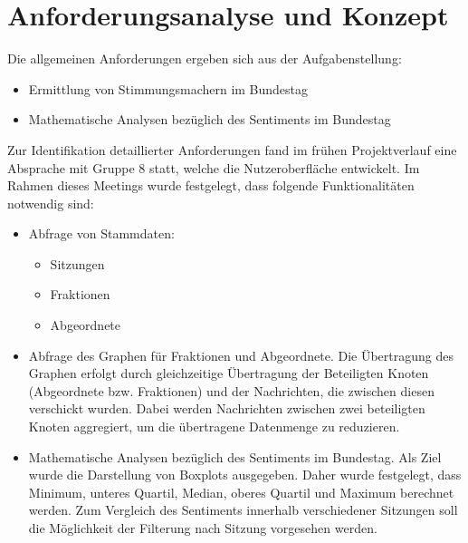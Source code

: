 \section{Anforderungsanalyse und Konzept}\label{sec:07_03_anforderungen_konzept}

Die allgemeinen Anforderungen ergeben sich aus der Aufgabenstellung:
\begin{itemize}
	\item Ermittlung von Stimmungsmachern im Bundestag
	\item Mathematische Analysen bezüglich des Sentiments im Bundestag
\end{itemize}

Zur Identifikation detaillierter Anforderungen fand im frühen Projektverlauf eine Absprache mit Gruppe 8 statt, welche die Nutzeroberfläche entwickelt.
Im Rahmen dieses Meetings wurde festgelegt, dass folgende Funktionalitäten notwendig sind:
\begin{itemize}
	\item Abfrage von Stammdaten:
	\begin{itemize}
		\item Sitzungen
		\item Fraktionen
		\item Abgeordnete
	\end{itemize}
	\item Abfrage des Graphen für Fraktionen und Abgeordnete. Die Übertragung des Graphen erfolgt durch gleichzeitige Übertragung der Beteiligten Knoten (Abgeordnete bzw. Fraktionen) und der Nachrichten, die zwischen diesen verschickt wurden. Dabei werden Nachrichten zwischen zwei beteiligten Knoten aggregiert, um die übertragene Datenmenge zu reduzieren.
	\item Mathematische Analysen bezüglich des Sentiments im Bundestag. Als Ziel wurde die Darstellung von Boxplots ausgegeben. Daher wurde festgelegt, dass Minimum, unteres Quartil, Median, oberes Quartil und Maximum berechnet werden. Zum Vergleich des Sentiments innerhalb verschiedener Sitzungen soll die Möglichkeit der Filterung nach Sitzung vorgesehen werden.
\end{itemize}

\newpage
